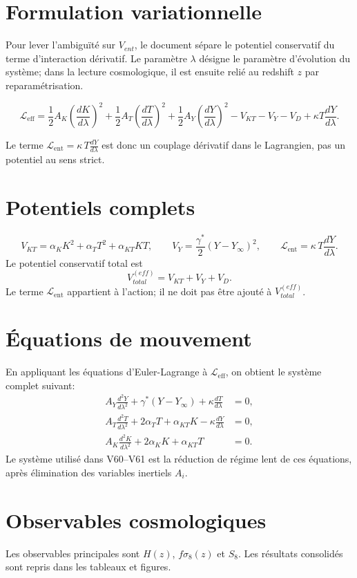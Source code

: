 \documentclass[11pt,a4paper]{article}
\newcommand{\kent}{\kappa} %
\newcommand{\Lent}{\mathcal{L}_{\mathrm{ent}}}
\begin{document}
\section{Formulation variationnelle}
Pour lever l'ambiguïté sur $V_{ent}$, le document sépare le potentiel conservatif du terme d'interaction dérivatif. Le paramètre $\lambda$ désigne le paramètre d'évolution du système; dans la lecture cosmologique, il est ensuite relié au redshift $z$ par reparamétrisation.

\[
\mathcal{L}_{\mathrm{eff}}=\frac12 A_K\left(\frac{dK}{d\lambda}\right)^2+\frac12 A_T\left(\frac{dT}{d\lambda}\right)^2+\frac12 A_Y\left(\frac{dY}{d\lambda}\right)^2 - V_{KT}-V_Y-V_D + \kent T\frac{dY}{d\lambda}.
\]

Le terme $\Lent=\kent\,T\frac{dY}{d\lambda}$ est donc un couplage dérivatif dans le Lagrangien, pas un potentiel au sens strict.

\section{Potentiels complets}
\[
V_{KT}=\alpha_K K^2 + \alpha_T T^2 + \alpha_{KT}KT,
\qquad
V_Y=\frac{\gamma^*}{2}(Y-Y_\infty)^2,
\qquad
\Lent=\kent\,T\frac{dY}{d\lambda}.
\]
Le potentiel conservatif total est
\[
V_{total}^{(eff)}=V_{KT}+V_Y+V_D.
\]
Le terme $\Lent$ appartient à l'action; il ne doit pas être ajouté à $V_{total}^{(eff)}$.

\section{Équations de mouvement}
En appliquant les équations d'Euler-Lagrange à $\mathcal{L}_{\mathrm{eff}}$, on obtient le système complet suivant:
\begin{align}
 A_Y\frac{d^2Y}{d\lambda^2}+\gamma^*(Y-Y_\infty)+\kent\frac{dT}{d\lambda} &= 0,\\
 A_T\frac{d^2T}{d\lambda^2}+2\alpha_T T+\alpha_{KT}K-\kent\frac{dY}{d\lambda} &= 0,\\
 A_K\frac{d^2K}{d\lambda^2}+2\alpha_K K+\alpha_{KT}T &= 0.
\end{align}
Le système utilisé dans V60--V61 est la réduction de régime lent de ces équations, après élimination des variables inertiels $A_i$.

\section{Observables cosmologiques}
Les observables principales sont $H(z)$, $f\sigma_8(z)$ et $S_8$. Les résultats consolidés sont repris dans les tableaux et figures.
\end{document}
